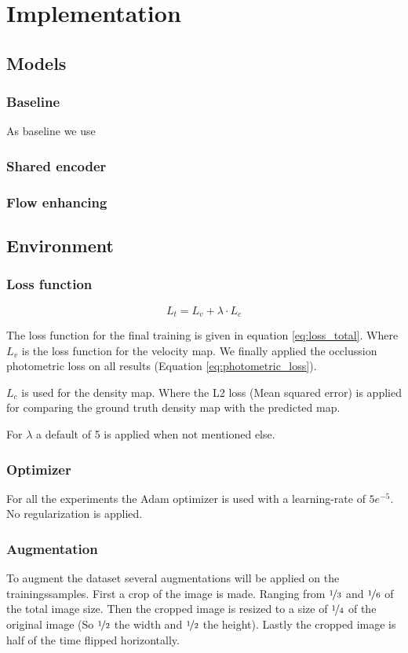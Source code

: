 \chapter{Implementation}

\section{Models}
\subsection{Baseline}
As baseline we use 
\subsection{Shared encoder}
\subsection{Flow enhancing}

\section{Environment}

\subsection{Loss function}
\begin{equation}
\label{eq:loss_total}
	L_{t} = L_{v} + \lambda \cdot L_{c}
\end{equation}

The loss function for the final training is given in equation \ref{eq:loss_total}. Where $L_{v}$ is the loss function for the velocity map. We finally applied the occlussion photometric loss on all results (Equation \ref{eq:photometric_loss}).

$L_{c}$ is used for the density map. Where the L2 loss (Mean squared error) is applied for comparing the ground truth density map with the predicted map.

For $\lambda$ a default of 5 is applied when not mentioned else.


\subsection{Optimizer}
For all the experiments the Adam optimizer is used with a learning-rate of $5e^{-5}$. No regularization is applied.

\subsection{Augmentation}
To augment the dataset several augmentations will be applied on the trainingssamples. First a crop of the image is made. Ranging from $\nicefrac{1}{3}$ and $\nicefrac{1}{6}$ of the total image size. Then the cropped image is resized to a size of $\nicefrac{1}{4}$ of the original image (So $\nicefrac{1}{2}$ the width and $\nicefrac{1}{2}$ the height). Lastly the cropped image is half of the time flipped horizontally.

